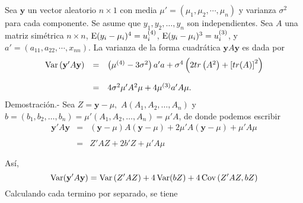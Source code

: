 \begin{teo}
    Sea $\textbf{y}$ un vector aleatorio $n\times 1$ con media $\mu'=(\mu_1,\mu_2,\cdots,\mu_n)$ y varianza $\sigma^2$ para cada componente. Se asume que $y_1,y_2,\ldots,y_n$ son independientes. Sea $A$ una matriz simétrica $n\times n$, $\mathop{\mbox{\normalfont E}}\nolimits(y_i-\mu_i)^4=u_i^{(4)}$, $\mathop{\mbox{\normalfont E}}\nolimits(y_i-\mu_i)^3=u_i^{(3)}$, y $a'=(a_{11},a_{22},\cdots,x_{nn})$. La varianza de la forma cuadrática $\textbf{y}A\textbf{y}$ es dada por 
    $$
    \begin{array}{rcl}
	\mathop{\mbox{\normalfont Var}}\nolimits\left(\textbf{y}'A\textbf{y}\right) &=& \left(\mu^{(4)}-3\sigma^2\right)a'a+\sigma^4\left(2tr\left(A^2\right)+\left[tr(A)\right]^2\right)\\\\
						&=& 4\sigma^2\mu'A^2\mu+4\mu^{(3)}a'A\mu.
    \end{array}
    $$
    \vspace{.5cm}
	Demostración.-\; Sea $Z=\textbf{y}-\mu,$ $A(A_1,A_2,\ldots,A_n)$ y $b=(b_1,b_2,\ldots,b_n)=\mu'(A_1,A_2,\ldots,A_n)=\mu'A$, de donde podemos escribir
    $$
    \begin{array}{rcl}
	\textbf{y}'A\textbf{y} &=& (\textbf{y}-\mu)A(\textbf{y}-\mu)+2\mu'A(\textbf{y}-\mu)+\mu'A\mu\\\\
			       &=& Z'AZ+2b'Z+\mu'A\mu\\\\
    \end{array}
    $$
    Así,
    $$\mathop{\mbox{\normalfont Var}}\nolimits(\textbf{y}'A\textbf{y})=\mathop{\mbox{\normalfont Var}}\nolimits\left(Z'AZ\right)+4\mathop{\mbox{\normalfont Var}}\nolimits(bZ)+4\mathop{\mbox{\normalfont Cov}}\nolimits\left(Z'AZ,bZ\right)$$
    Calculando cada termino por separado, se tiene

\end{teo}
